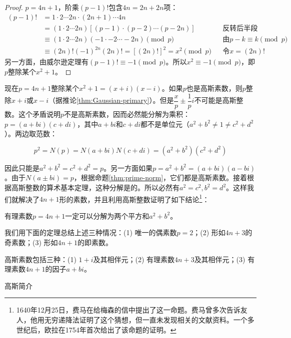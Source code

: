 \documentclass[b5paper]{ctexart}
\begin{document}
\begin{proof}
$p = 4n + 1$，阶乘$(p - 1)!$包含$4n = 2n + 2n$项：
\begin{align*}
(p - 1)! &= 1 \cdot 2  \dotsm  2n \cdot (2n + 1)  \dotsm  4n \\
  &= (1 \cdot 2  \dotsm  2n)[(p - 1) \cdot (p - 2)  \dotsm  (p - 2n)] && \text{反转后半段} \\
  &\equiv (1 \cdot 2  \dotsm 2n)(-1 \cdot -2 \dotsm -2n) \pmod p && \text{由} p - k \equiv k \pmod p \\
  &\equiv (2n)!(-1)^{2n}(2n)! = [(2n)!]^2 = x^2 \pmod p && \text{令} x = (2n)!
\end{align*}
另一方面，由威尔逊定理有$(p - 1)! \equiv -1 \pmod p$。所以$x^2 \equiv -1 \pmod p$，即$p$整除某个$x^2 + 1$。
\end{proof}

现在$p = 4n + 1$整除某个$x^2 + 1 = (x + i)(x - i)$。如果$p$也是高斯素数，则$p$整除$x + i$或$x - i$（据推论\ref{thm:Gaussian-primary}）。但是$\dfrac{x}{p} \pm \dfrac{1}{p}i$不可能是高斯整数。这个矛盾说明$p$不是高斯素数，因而必然能分解为乘积：$p = (a + bi)(c + di)$，其中$a + bi$和$c + di$都不是单位元（$a^2 + b^2 \ne 1 \ne c^2 + d^2$）。两边取范数：

\[
p^2 = N(p) = N(a+bi)N(c+di) = (a^2 + b^2)(c^2 + d^2)
\]

因此只能是$a^2 + b^2 = c^2 + d^2 = p$。另一方面如果$p = a^2 + b^2 = (a + bi)(a - bi)$。由于$N(a \pm bi) = p$，根据命题\ref{thm:prime-norm}，它们都是高斯素数。接着根据高斯整数的算术基本定理，这种分解是的。所以必然有$a^2 = c^2, b^2 = d^2$。这样我们就解决了$4n + 1$形的素数，并且利用高斯整数证明了如下结论\footnote{1640年12月25日，费马在给梅森的信中提出了这一命题。费马曾多次告诉友人，他用无穷递降法证明了这个猜想，但一直未发现相关的文献资料。一个多世纪后，欧拉在1754年首次给出了该命题的证明。}：

\begin{theorem}[费马平方和定理]
有理素数$p = 4n + 1$一定可以分解为两个平方和$a^2 + b^2$。
\end{theorem}

我们用下面的定理总结上述三种情况：(1) 唯一的偶素数$p = 2$；(2) 形如$4n + 3$的奇素数；(3) 形如$4n + 1$的即素数。

\begin{theorem}
高斯素数包括三种：(1) $1 + i$及其相伴元；(2) 有理素数$4n + 3$及其相伴元；(3) 有理素数$4n + 1$的因子$a + bi$。
\end{theorem}

\begin{mdframed}
高斯简介
\end{mdframed}
\end{document}
